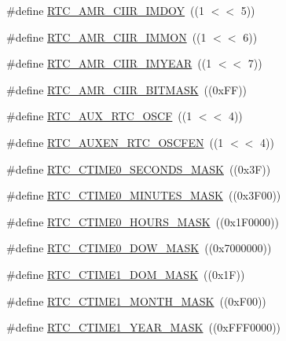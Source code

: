 \begin{DoxyCompactItemize}
\#define \hyperlink{group__RTC__17XX__40XX_gaec7d51e7a503514c1d71bf9428c6f3e8}{R\-T\-C\-\_\-\-A\-M\-R\-\_\-\-C\-I\-I\-R\-\_\-\-I\-M\-D\-O\-Y}~((1 $<$$<$ 5))
\item 
\#define \hyperlink{group__RTC__17XX__40XX_ga841dfecc952d8b6d275e799cb9e89c02}{R\-T\-C\-\_\-\-A\-M\-R\-\_\-\-C\-I\-I\-R\-\_\-\-I\-M\-M\-O\-N}~((1 $<$$<$ 6))
\item 
\#define \hyperlink{group__RTC__17XX__40XX_ga56b312d9e291685d843f6dae171f4441}{R\-T\-C\-\_\-\-A\-M\-R\-\_\-\-C\-I\-I\-R\-\_\-\-I\-M\-Y\-E\-A\-R}~((1 $<$$<$ 7))
\item 
\#define \hyperlink{group__RTC__17XX__40XX_gafcc754fba01521c5aa4f1775b889e894}{R\-T\-C\-\_\-\-A\-M\-R\-\_\-\-C\-I\-I\-R\-\_\-\-B\-I\-T\-M\-A\-S\-K}~((0x\-F\-F))
\item 
\#define \hyperlink{group__RTC__17XX__40XX_gaafb1215dfd0f9bbe198274689a1f1584}{R\-T\-C\-\_\-\-A\-U\-X\-\_\-\-R\-T\-C\-\_\-\-O\-S\-C\-F}~((1 $<$$<$ 4))
\item 
\#define \hyperlink{group__RTC__17XX__40XX_ga12b8af6f1d4757d19c1b09d85d3fc497}{R\-T\-C\-\_\-\-A\-U\-X\-E\-N\-\_\-\-R\-T\-C\-\_\-\-O\-S\-C\-F\-E\-N}~((1 $<$$<$ 4))
\item 
\#define \hyperlink{group__RTC__17XX__40XX_ga913865a5d046fddddcae67fb05210d87}{R\-T\-C\-\_\-\-C\-T\-I\-M\-E0\-\_\-\-S\-E\-C\-O\-N\-D\-S\-\_\-\-M\-A\-S\-K}~((0x3\-F))
\item 
\#define \hyperlink{group__RTC__17XX__40XX_ga3b8e88e913a22b08a7b814763e4c8452}{R\-T\-C\-\_\-\-C\-T\-I\-M\-E0\-\_\-\-M\-I\-N\-U\-T\-E\-S\-\_\-\-M\-A\-S\-K}~((0x3\-F00))
\item 
\#define \hyperlink{group__RTC__17XX__40XX_ga1778d80de2c97e680394bdd8770b9119}{R\-T\-C\-\_\-\-C\-T\-I\-M\-E0\-\_\-\-H\-O\-U\-R\-S\-\_\-\-M\-A\-S\-K}~((0x1\-F0000))
\item 
\#define \hyperlink{group__RTC__17XX__40XX_gaee63196753f1c3ce9621a780c2fae3c9}{R\-T\-C\-\_\-\-C\-T\-I\-M\-E0\-\_\-\-D\-O\-W\-\_\-\-M\-A\-S\-K}~((0x7000000))
\item 
\#define \hyperlink{group__RTC__17XX__40XX_gaa8d85ab9bd2feee7a013b3b422bb740d}{R\-T\-C\-\_\-\-C\-T\-I\-M\-E1\-\_\-\-D\-O\-M\-\_\-\-M\-A\-S\-K}~((0x1\-F))
\item 
\#define \hyperlink{group__RTC__17XX__40XX_ga9778cbc861fb273870db239e31cc6140}{R\-T\-C\-\_\-\-C\-T\-I\-M\-E1\-\_\-\-M\-O\-N\-T\-H\-\_\-\-M\-A\-S\-K}~((0x\-F00))
\item 
\#define \hyperlink{group__RTC__17XX__40XX_gae56e613fe29951a7adaa30e1a3cad8b4}{R\-T\-C\-\_\-\-C\-T\-I\-M\-E1\-\_\-\-Y\-E\-A\-R\-\_\-\-M\-A\-S\-K}~((0x\-F\-F\-F0000))
$$
\end{DoxyCompactItemize}
